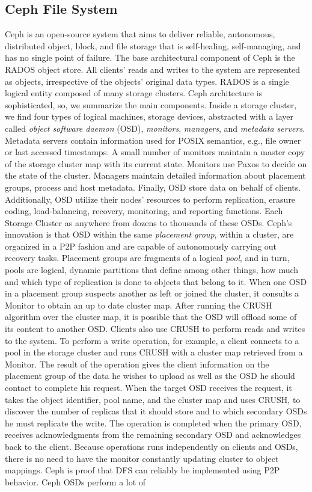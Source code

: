 \documentclass[runningheads]{llncs}
\begin{document}
\subsection{Ceph File System}

Ceph \cite{ceph} is an open-source system that aims to deliver reliable, autonomous, distributed object, block, and file storage that is self-healing, self-managing, and has no single point of failure. The base architectural component of Ceph is the RADOS object store. All clients' reads and writes to the system are represented as objects, irrespective of the objects' original data types. RADOS is a single logical entity composed of many storage clusters. Ceph architecture is sophisticated, so, we summarize the main components. Inside a storage cluster, we find four types of logical machines, storage devices, abstracted with a layer called \textit{object software daemon} (OSD), \textit{monitors}, \textit{managers}, and \textit{metadata servers}. Metadata servers contain information used for POSIX semantics, e.g., file owner or last accessed timestamps. A small number of monitors maintain a master copy of the storage cluster map with its current state. Monitors use Paxos to decide on the state of the cluster. Managers maintain detailed information about placement groups, process and host metadata. Finally, OSD store data on behalf of clients. Additionally, OSD utilize their nodes' resources to perform replication, erasure coding, load-balancing, recovery, monitoring, and reporting functions. Each Storage Cluster as anywhere from dozens to thousands of these OSDs. Ceph's innovation is that OSD within the same \textit{placement group}, within a cluster, are organized in a P2P fashion and are capable of autonomously carrying out recovery tasks. Placement groups are fragments of a logical \textit{pool}, and in turn, pools are logical, dynamic partitions that define among other things, how much and which type of replication is done to objects that belong to it. When one OSD in a placement group suspects another as left or joined the cluster, it consults a Monitor to obtain an up to date cluster map. After running the CRUSH algorithm\cite{crush} over the cluster map, it is possible that the OSD will offload some of its content to another OSD. Clients also use CRUSH to perform reads and writes to the system. To perform a write operation, for example, a client connects to a pool in the storage cluster and runs CRUSH with a cluster map retrieved from a Monitor. The result of the operation gives the client information on the placement group of the data he wishes to upload as well as the OSD he should contact to complete his request. When the target OSD receives the request, it takes the object identifier, pool name, and the cluster map and uses CRUSH, to discover the number of replicas that it should store and to which secondary OSDs he must replicate the write. The operation is completed when the primary OSD, receives acknowledgments from the remaining secondary OSD and acknowledges back to the client. Because operations runs independently on clients and OSDs, there is no need to have the monitor constantly updating cluster to object mappings. Ceph is proof that DFS can reliably be implemented using P2P behavior. Ceph OSDs perform a lot of 
\end{document}
